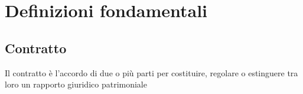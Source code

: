 \newpage
\section{Definizioni fondamentali}
\subsection{Contratto}
Il contratto è l'accordo di due o più parti per costituire, regolare o estinguere
tra loro un rapporto giuridico patrimoniale